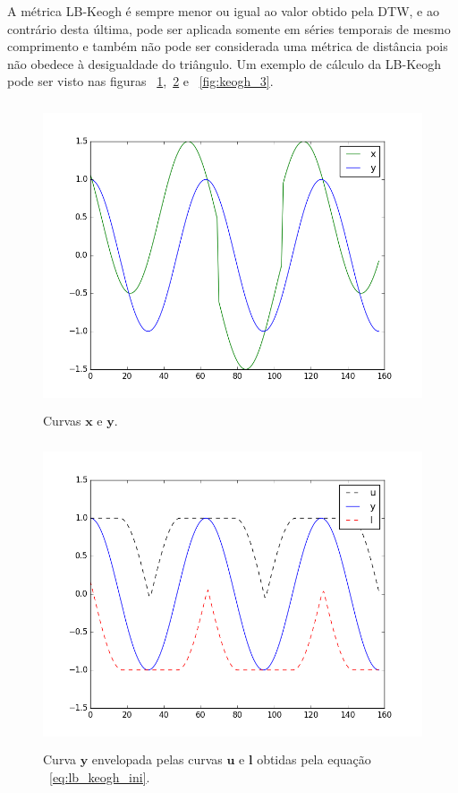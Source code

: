 A métrica LB-Keogh é sempre menor ou igual ao valor obtido pela DTW, e ao contrário desta última, pode ser aplicada somente em séries temporais de mesmo comprimento e também não pode ser considerada uma métrica de distância pois não obedece à desigualdade do triângulo. Um exemplo de cálculo da LB-Keogh pode ser visto nas figuras ~\ref{fig:keogh_1},~\ref{fig:keogh_2} e ~\ref{fig:keogh_3}.
\begin{figure} 
	\centering
	\includegraphics[height=9cm,keepaspectratio]{figuras/lb_keogh_1.png}
	\caption{Curvas $\bm{x}$ e $\bm{y}$.}
	\label{fig:keogh_1}
\end{figure}
\begin{figure}
	\centering
	\includegraphics[height=9cm,keepaspectratio]{figuras/lb_keogh_2.png}
	\caption{Curva $\bm{y}$ envelopada pelas curvas $\bm{u}$ e $\bm{l}$ obtidas pela equação ~\ref{eq:lb_keogh_ini}.}
	\label{fig:keogh_2}
\end{figure}
